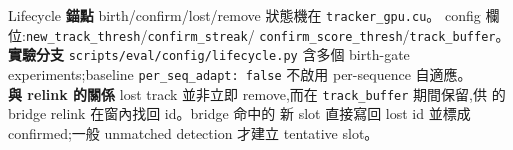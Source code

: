 \begin{implsupp}{Lifecycle}
\textbf{錨點}\;\; birth/confirm/lost/remove 狀態機在 \texttt{tracker\_gpu.cu}。
config 欄位:\texttt{new\_track\_thresh}/\texttt{confirm\_streak}/
\texttt{confirm\_score\_thresh}/\texttt{track\_buffer}。\\
\textbf{實驗分支}\;\; \texttt{scripts/eval/config/lifecycle.py} 含多個 birth-gate
experiments;baseline \texttt{per\_seq\_adapt: false} 不啟用 per-sequence 自適應。\\
\textbf{與 relink 的關係}\;\; lost track 並非立即 remove,而在 \texttt{track\_buffer}
期間保留,供  的 bridge relink 在窗內找回 id。bridge 命中的
新 slot 直接寫回 lost id 並標成 confirmed;一般 unmatched detection 才建立
tentative slot。
\end{implsupp}
